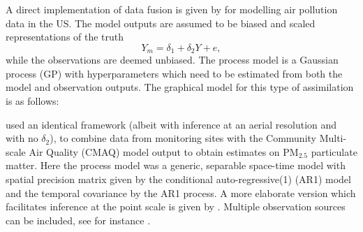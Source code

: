 \documentclass[10pt,a4paper]{article}
\begin{document}
A direct implementation of data fusion is given by \cite{Fuentes_2005} for modelling air pollution data in the US. The model outputs are assumed to be biased and scaled representations of the truth
\begin{equation}
Y_m = \delta_1 + \delta_2Y + e,
\end{equation}
\noindent while the observations are deemed unbiased. The process model is a Gaussian process (GP) with hyperparameters which need to be estimated from both the model and observation outputs. The graphical model for this type of assimilation is as follows:
\begin{figure}[h!]
\centering
{}
\end{figure}

\noindent \cite{McMillan_2010} used an identical framework (albeit with inference at an aerial resolution and with no $\delta_2$), to combine data from monitoring sites with the Community Multi-scale Air Quality (CMAQ) model output to obtain estimates on PM$_{2.5}$ particulate matter. Here the process model was a generic, separable space-time model with spatial precision matrix given by the conditional auto-regressive(1) (AR1) model \citep{Rue_2005} and the temporal covariance by the AR1 process. A more elaborate version which facilitates inference at the point scale is given by \cite{Sahu_2010}. Multiple observation sources can be included, see for instance \cite{Smith_2007, Kang_2012}. 
\end{document}
